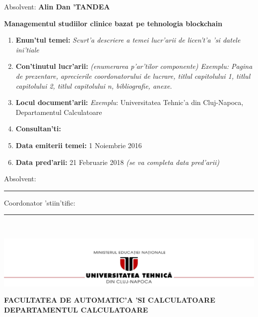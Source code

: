 \documentclass[12pt,a4paper,twoside]{report}
\renewcommand{\thesisauthor}{Alin Dan 'TANDEA}    %
\renewcommand{\thesistitle}{Managementul studiilor clinice bazat pe
tehnologia blockchain} %
\newcommand{\department}{FACULTATEA DE AUTOMATIC'A 'SI CALCULATOARE\\
DEPARTAMENTUL CALCULATOARE}
\newcommand{\uline}[1]{\rule[0pt]{#1}{0.4pt}}
\newcommand{\utcnlogo}{\includegraphics[width=15cm]{img/utcn.jpg}}
\begin{document}
\vspace{2cm}

\begin{center}
Absolvent: {\bf \thesisauthor}

\vspace{1cm}

{\bf \thesistitle}
\end{center}

\vspace{1cm}

\begin{enumerate}
 \item {\bf Enun'tul temei:} {\it Scurt'a descriere a temei lucr'arii de licen't'a 'si datele ini'tiale}
\item {\bf Con'tinutul lucr'arii:} {\it (enumerarea p'ar'tilor componente) Exemplu: Pagina de prezentare, aprecierile coordonatorului de lucrare, titlul capitolului 1, titlul capitolului 2, titlul capitolului n, bibliografie, anexe.}
\item {\bf Locul document'arii:} {\it Exemplu}: Universitatea Tehnic'a din Cluj-Napoca, Departamentul Calculatoare
\item {\bf Consultan'ti:}
\item {\bf Data emiterii temei:} 1 Noiembrie 2016
\item {\bf Data pred'arii:} 21 Februarie 2018 {\it (se va completa data pred'arii)}
  \end{enumerate}
\vspace{1.2cm}

\hspace{6cm} Absolvent: \uline{6cm} 

\vspace{0.5cm}
\hspace{6cm} Coordonator 'stiin'tific: \uline{5cm} 

\thispagestyle{empty}


\newpage
$ $


\thispagestyle{empty}
\newpage

\begin{center}
\utcnlogo

{\bf \department}
\end{center}

\vspace{0.5cm}
\end{document}
